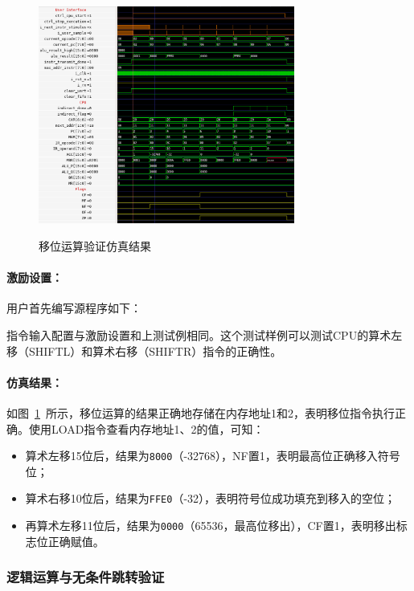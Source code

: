 \documentclass[lang=cn,a4paper,newtx]{elegantpaper}
\begin{document}
\begin{figure}[htbp]
  \centering
  \caption{移位运算验证仿真结果}
  \includegraphics[width = 0.75\textwidth]{figure/cpu_sim_shift.png}
  \label{fig:sim:3}
\end{figure}

\paragraph{激励设置：}

用户首先编写源程序如下：


指令输入配置与激励设置和上测试例相同。这个测试样例可以测试CPU的算术左移（SHIFTL）和算术右移（SHIFTR）指令的正确性。

\paragraph{仿真结果：}

如图~\ref{fig:sim:3}~所示，移位运算的结果正确地存储在内存地址1和2，表明移位指令执行正确。使用LOAD指令查看内存地址1、2的值，可知：
\begin{itemize}
  \item 算术左移15位后，结果为\texttt{8000}（-32768），NF置1，表明最高位正确移入符号位；
  \item 算术右移10位后，结果为\texttt{FFE0}（-32），表明符号位成功填充到移入的空位；
  \item 再算术左移11位后，结果为\texttt{0000}（65536，最高位移出），CF置1，表明移出标志位正确赋值。
\end{itemize}



\subsubsection{逻辑运算与无条件跳转验证}
\end{document}
